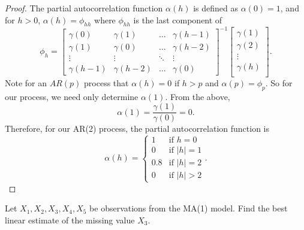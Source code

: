 \documentclass[12pt]{article}
\theoremstyle{definition}
\newenvironment{custompbm}[1]
  {\renewcommand\theproblem{#1}\problem}
  {\endproblem}
\begin{document}
\begin{proof}
  The partial autocorrelation function $\alpha(h)$ is defined as $\alpha(0) = 1$,
  and for $h > 0$, $\alpha(h) = \phi_{hh}$ where $\phi_{hh}$ is the last component of
  \[
    \phi_h =
    \begin{bmatrix}
      \gamma(0) & \gamma(1) & \dots & \gamma(h-1) \\
      \gamma(1) & \gamma(0) & \dots & \gamma(h-2) \\
      \vdots & \vdots & \ddots & \vdots \\
      \gamma(h - 1) & \gamma(h-2) & \dots & \gamma(0)
    \end{bmatrix}^{-1}
    \begin{bmatrix}
      \gamma(1) \\
      \gamma(2) \\
      \vdots\\
      \gamma(h) \\
    \end{bmatrix}.
  \]
  Note for an $AR(p)$ process that $\alpha(h) = 0$ if $h > p$ and $\alpha(p) = \phi_p$. So for our process, we need only determine
  $\alpha(1)$. From the above,
  \[
    \alpha(1) = \frac{\gamma(1)}{\gamma(0)} = 0.
  \]
  Therefore, for our AR(2) process, the partial autocorrelation function is
  \[
    \alpha(h) =
    \begin{cases}
      1 & \text{if $h = 0$}\\
      0 & \text{if $|h| = 1$}\\
      0.8 & \text{if $|h| = 2$} \\
      0 & \text{if $|h| > 2$}
    \end{cases}.
  \]
\end{proof}


\begin{custompbm}{4.a}
  Let $X_1, X_2, X_3, X_4, X_5$ be observations from the MA(1) model.
  Find the best linear estimate of the missing value $X_3$.
\end{custompbm}
\end{document}
